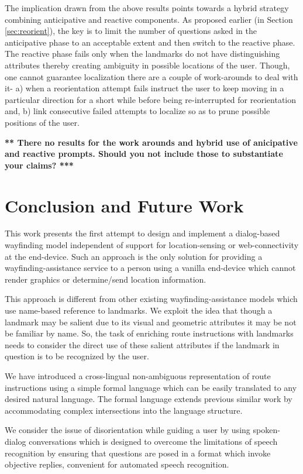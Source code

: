 \documentclass{iitkthesis}
\begin{document}
The implication drawn from the above results points towards a hybrid 
strategy combining anticipative and reactive components. As proposed earlier
(in Section \ref{sec:reorient}), the key is to limit the number of 
questions asked in the anticipative phase to an acceptable extent and then 
switch to the reactive phase. The reactive phase fails only when the 
landmarks do not have distinguishing attributes thereby creating ambiguity in 
possible locations of the user. Though, one cannot guarantee localization 
there are a couple of work-arounds to deal with it- a) when a 
reorientation attempt fails instruct the user to keep moving in a 
particular direction for a short while before being re-interrupted for 
reorientation and, b) link consecutive failed attempts to localize 
so as to prune possible positions of the user. 

{\bf *** There no results for the work arounds and hybrid use
of anicipative and reactive prompts. Should you not include those
to substantiate your claims? ***}

 \chapter{Conclusion and Future Work}
This work presents the first attempt to design and implement a 
dialog-based wayfinding model independent of support for location-sensing 
or web-connectivity at the end-device. Such an approach is the only 
solution for providing a wayfinding-assistance service to a person using a 
vanilla end-device which cannot render graphics or determine/send location 
information. 

This approach is different from other existing wayfinding-assistance 
models which use name-based reference to landmarks. We exploit the
idea that though a landmark may be salient due to its visual and geometric 
attributes it may be not be familiar by name. So,
the task of enriching route instructions with landmarks needs to consider 
the direct use of these salient attributes if the landmark in question 
is to be recognized by the user. 

We have introduced a cross-lingual non-ambiguous representation of route 
instructions using a simple formal language which can be easily translated 
to any desired natural language. The formal language extends previous 
similar work by accommodating complex intersections into the language 
structure.

We consider the issue of disorientation while guiding a 
user by using spoken-dialog conversations which is designed to 
overcome the limitations of speech recognition by ensuring that questions are 
posed in a format which invoke objective replies, convenient for automated 
speech recognition.
\end{document}
